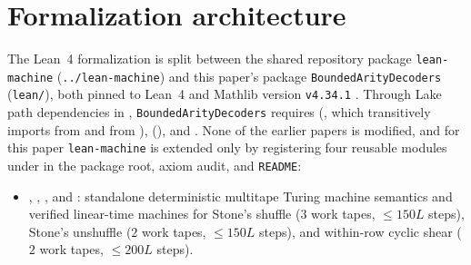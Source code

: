 \section{Formalization architecture}\label{sec:formalization}

The Lean~4 formalization is split between the shared repository package \texttt{lean-machine}
(\texttt{../lean-machine}) and this paper's package \texttt{BoundedArityDecoders} (\texttt{lean/}),
both pinned to Lean~4 and Mathlib version \texttt{v4.34.1} \cite{Mathlib2026}. Through Lake path
dependencies in , \texttt{BoundedArityDecoders} requires
 (\cite{SharedDecoders2026}, which transitively imports
 from \cite{SeventeenthPaper2026} and  from
\cite{FirstPaper2026}),  (\cite{ClassUniformMemo2026}), and
. None of the earlier papers is modified, and for this paper
\texttt{lean-machine} is extended only by registering four reusable modules under
 in the package root, axiom audit, and \texttt{README}:
\begin{itemize}[leftmargin=1.5em]
\item {}, , , and
  : standalone deterministic multitape Turing machine semantics and verified
  linear-time machines for Stone's shuffle ($3$ work tapes, $\le 150 L$ steps), Stone's unshuffle
  ($2$ work tapes, $\le 150 L$ steps), and within-row cyclic shear ($2$ work tapes, $\le 200 L$
  steps).
\end{itemize}

